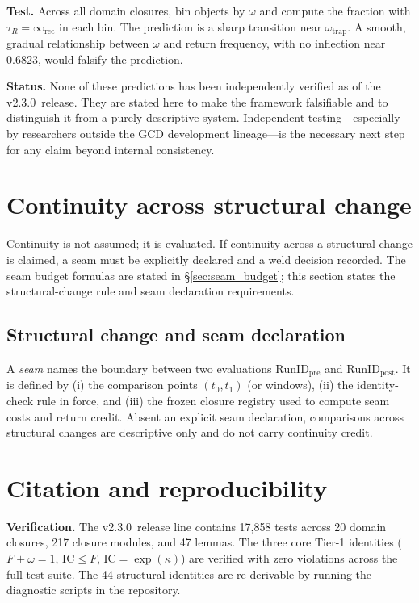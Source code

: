 \documentclass[
  aps,
  prd,
  preprint,
  superscriptaddress,
  nofootinbib,
  floatfix
]{revtex4-2}
\newcommand{\Rinf}{\infty_{\mathrm{rec}}}
\newcommand{\IC}{\mathrm{IC}}
\newcommand{\ValidatorLine}{v2.3.0}
\begin{document}
\textbf{Test.} Across all domain closures, bin objects by $\omega$ and compute the fraction with $\tau_R = \Rinf$
in each bin. The prediction is a sharp transition near $\omega_{\mathrm{trap}}$.
A smooth, gradual relationship between $\omega$ and return frequency, with no inflection near 0.6823,
would falsify the prediction.

\medskip
\noindent\textbf{Status.}
None of these predictions has been independently verified as of the \ValidatorLine\ release.
They are stated here to make the framework falsifiable and to distinguish it from a purely descriptive system.
Independent testing---especially by researchers outside the GCD development lineage---is the necessary
next step for any claim beyond internal consistency.

\section{Continuity across structural change}
\label{sec:continuity}

Continuity is not assumed; it is evaluated. If continuity across a structural change is claimed, a seam must be
explicitly declared and a weld decision recorded. The seam budget formulas are stated in \S\ref{sec:seam_budget};
this section states the structural-change rule and seam declaration requirements.

\subsection{Structural change and seam declaration}
A \emph{seam} names the boundary between two evaluations $\mathrm{RunID}_{\mathrm{pre}}$ and $\mathrm{RunID}_{\mathrm{post}}$.
It is defined by (i) the comparison points $(t_0,t_1)$ (or windows), (ii) the identity-check rule in force,
and (iii) the frozen closure registry used to compute seam costs and return credit.
Absent an explicit seam declaration, comparisons across structural changes are descriptive only and do not carry continuity credit.
\section{Citation and reproducibility}
\label{sec:citation_repro}

\noindent\textbf{Verification.}
The \ValidatorLine\ release line contains 17{,}858 tests across 20 domain closures, 217 closure modules,
and 47 lemmas. The three core Tier-1 identities ($F+\omega=1$, $\IC\le F$, $\IC=\exp(\kappa)$) are verified with
zero violations across the full test suite. The 44 structural identities are re-derivable by running the diagnostic
scripts in the repository.
\end{document}
